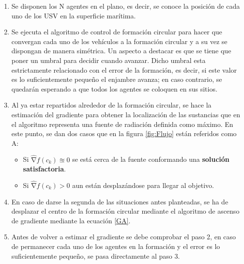 \begin{enumerate}
	\item Se disponen los N agentes en el plano, es decir, se conoce la posición de cada uno de los USV en la superficie marítima.
	\item Se ejecuta el algoritmo de control de formación circular para hacer que convergan cada uno de los vehículos a la formación circular y a su vez se dispongan de manera simétrica. Un aspecto a destacar es que se tiene que poner un umbral para decidir cuando avanzar. Dicho umbral esta estrictamente relacionado con el error de la formación, es decir, si este valor es lo suficientemente pequeño el enjambre avanza; en caso contrario, se quedarán esperando a que todos los agentes se coloquen en sus sitios. 
	\item Al ya estar repartidos alrededor de la formación circular, se hace la estimación del gradiente para obtener la localización de las sustancias que en el algoritmo representa una fuente de radiación definida como máximo. En este punto, se dan dos casos que en la figura \ref{fig:Flujo} están referidos como A:
	\begin{itemize}
		\item Si $\widehat{\mathrm{\nabla }}{f}\left(c_{k}\right)\approxeq0$ se está cerca de la fuente conformando una \textbf{solución satisfactoria}.
		\item Si $\widehat{\mathrm{\nabla }}{f}\left(c_{k}\right)>0$ aun están desplazándose para llegar al objetivo.
	\end{itemize}
	\item En caso de darse la segunda de las situaciones antes planteadas, se ha de desplazar el centro de la formación circular mediante el algoritmo de ascenso de gradiente mediante la ecuación \ref{GA}.
	\item Antes de volver a estimar el gradiente se debe comprobar el paso 2, en caso de permanecer cada uno de los agentes en la formación y el error es lo suficientemente pequeño, se pasa directamente al paso 3.
\end{enumerate}









